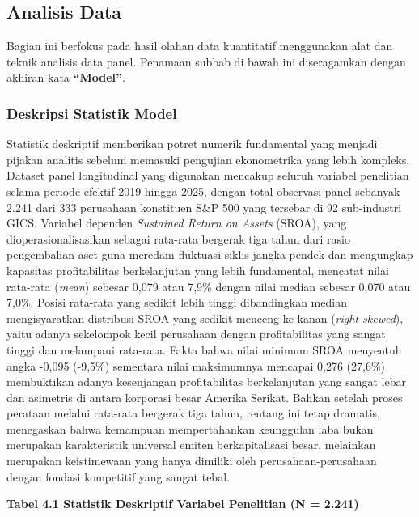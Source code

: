 \documentclass[12pt,a4paper]{article}
\begin{document}
\subsection{Analisis Data}\label{analisis-data}

Bagian ini berfokus pada hasil olahan data kuantitatif menggunakan alat
dan teknik analisis data panel. Penamaan subbab di bawah ini
diseragamkan dengan akhiran kata \textbf{``Model''}.

\subsubsection{Deskripsi Statistik
Model}\label{deskripsi-statistik-model-1}

Statistik deskriptif memberikan potret numerik fundamental yang menjadi
pijakan analitis sebelum memasuki pengujian ekonometrika yang lebih
kompleks. Dataset panel longitudinal yang digunakan mencakup seluruh
variabel penelitian selama periode efektif 2019 hingga 2025, dengan
total observasi panel sebanyak 2.241 dari 333 perusahaan konstituen S\&P
500 yang tersebar di 92 sub-industri GICS. Variabel dependen
\emph{Sustained Return on Assets} (SROA), yang dioperasionalisasikan
sebagai rata-rata bergerak tiga tahun dari rasio pengembalian aset guna
meredam fluktuasi siklis jangka pendek dan mengungkap kapasitas
profitabilitas berkelanjutan yang lebih fundamental, mencatat nilai
rata-rata (\emph{mean}) sebesar 0,079 atau 7,9\% dengan nilai median
sebesar 0,070 atau 7,0\%. Posisi rata-rata yang sedikit lebih tinggi
dibandingkan median mengisyaratkan distribusi SROA yang sedikit menceng
ke kanan (\emph{right-skewed}), yaitu adanya sekelompok kecil perusahaan
dengan profitabilitas yang sangat tinggi dan melampaui rata-rata. Fakta
bahwa nilai minimum SROA menyentuh angka -0,095 (-9,5\%) sementara nilai
maksimumnya mencapai 0,276 (27,6\%) membuktikan adanya kesenjangan
profitabilitas berkelanjutan yang sangat lebar dan asimetris di antara
korporasi besar Amerika Serikat. Bahkan setelah proses perataan melalui
rata-rata bergerak tiga tahun, rentang ini tetap dramatis, menegaskan
bahwa kemampuan mempertahankan keunggulan laba bukan merupakan
karakteristik universal emiten berkapitalisasi besar, melainkan
merupakan keistimewaan yang hanya dimiliki oleh perusahaan-perusahaan
dengan fondasi kompetitif yang sangat tebal.

{}
\noindent\textbf{Tabel 4.1 Statistik Deskriptif Variabel Penelitian (N = 2.241)}
\end{document}
